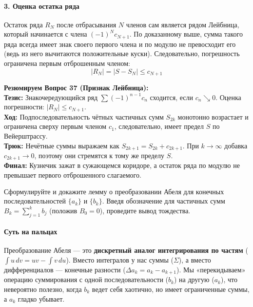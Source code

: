 \paragraph{3. Оценка остатка ряда}
Остаток ряда $R_N$ после отбрасывания $N$ членов сам является рядом Лейбница, который начинается с члена $(-1)^N c_{N+1}$.
По доказанному выше, сумма такого ряда всегда имеет знак своего первого члена и по модулю не превосходит его (ведь из него вычитаются положительные куски).
Следовательно, погрешность ограничена первым отброшенным членом:
$$ |R_N| = |S - S_N| \le c_{N+1} $$

\begin{tcolorbox}[colback=gray!5, colframe=black, boxrule=0.5pt, arc=0pt]
\textbf{Резюмируем Вопрос 37 (Признак Лейбница):} \\
\textbf{Тезис:} Знакочередующийся ряд $\sum (-1)^{n-1} c_n$ сходится, если $c_n \searrow 0$. Оценка погрешности: $|R_N| \le c_{N+1}$. \\
\textbf{Ход:} Подпоследовательность чётных частичных сумм $S_{2k}$ монотонно возрастает и ограничена сверху первым членом $c_1$, следовательно, имеет предел $S$ по Вейерштрассу. \\
\textbf{Трюк:} Нечётные суммы выражаем как $S_{2k+1} = S_{2k} + c_{2k+1}$. При $k \to \infty$ добавка $c_{2k+1} \to 0$, поэтому они стремятся к тому же пределу $S$. \\
\textbf{Финал:} Кузнечик зажат в сужающемся коридоре, а остаток ряда по модулю не превышает первого отброшенного слагаемого.
\end{tcolorbox}




{Сформулируйте и докажите лемму о преобразовании Абеля для конечных последовательностей $\{a_{k}\}$ и $\{b_{k}\}$. Введя обозначение для частичных сумм $B_{k}=\sum_{j=1}^{k}b_{j}$ (положив $B_{0}=0$), проведите вывод тождества.}

\paragraph{Суть на пальцах}
Преобразование Абеля — это \textbf{дискретный аналог интегрирования по частям} ($\int u\,dv = uv - \int v\,du$). Вместо интегралов у нас суммы ($\Sigma$), а вместо дифференциалов — конечные разности ($\Delta a_k = a_k - a_{k+1}$). Мы «перекидываем» операцию суммирования с одной последовательности ($b_k$) на другую ($a_k$), что невероятно полезно, когда $b_k$ ведет себя хаотично, но имеет ограниченные суммы, а $a_k$ гладко убывает.

